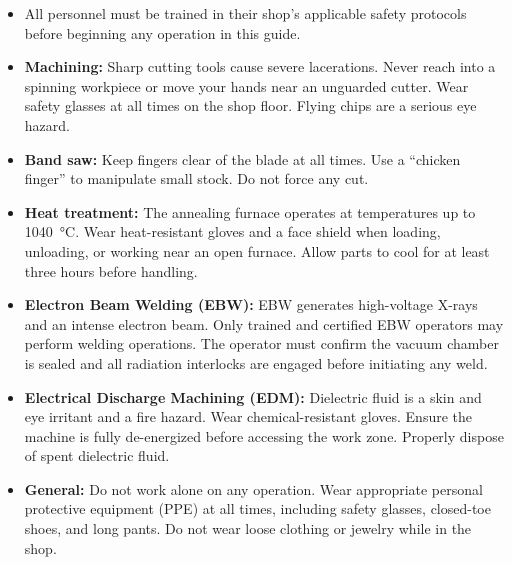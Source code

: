 \documentclass[12pt, letterpaper]{report}%
\begin{document}
\begin{appendices}
\begin{warningbox}
		\medskip
		\begin{itemize}[leftmargin=1.5em, itemsep=2pt]
			\item All personnel must be trained in their shop's applicable safety protocols before
						beginning any operation in this guide.
			\item \textbf{Machining:} Sharp cutting tools cause severe lacerations. Never reach into
						a spinning workpiece or move your hands near an unguarded cutter. Wear safety
						glasses at all times on the shop floor. Flying chips are a serious eye hazard.
			\item \textbf{Band saw:} Keep fingers clear of the blade at all times. Use a ``chicken finger''
						to manipulate small stock. Do not force any cut.
			\item \textbf{Heat treatment:} The annealing furnace operates at temperatures up to
						\SI{1040}{\degreeCelsius}. Wear heat-resistant gloves and a face shield when
						loading, unloading, or working near an open furnace.
						Allow parts to cool for at least three hours before handling.
			\item \textbf{Electron Beam Welding (EBW):} EBW generates high-voltage X-rays and an
						intense electron beam. Only trained and certified EBW operators may perform
						welding operations. The operator must confirm the vacuum chamber is sealed and
						all radiation interlocks are engaged before initiating any weld.
		\end{itemize}
	\end{warningbox}
	\newpage
	\begin{warningbox}
		\begin{itemize}[leftmargin=1.5em, itemsep=2pt]
			\item \textbf{Electrical Discharge Machining (EDM):} Dielectric fluid is a skin and
						eye irritant and a fire hazard. Wear chemical-resistant gloves. Ensure the machine
						is fully de-energized before accessing the work zone. Properly dispose of spent
						dielectric fluid.
			\item \textbf{General:} Do not work alone on any operation. Wear
						appropriate personal protective equipment (PPE) at all times, including safety glasses, closed-toe shoes, 
						and long pants.
						Do not wear loose clothing or jewelry while in the shop.
		\end{itemize}
	\end{warningbox}

	\bigskip


\end{appendices}
\end{document}

